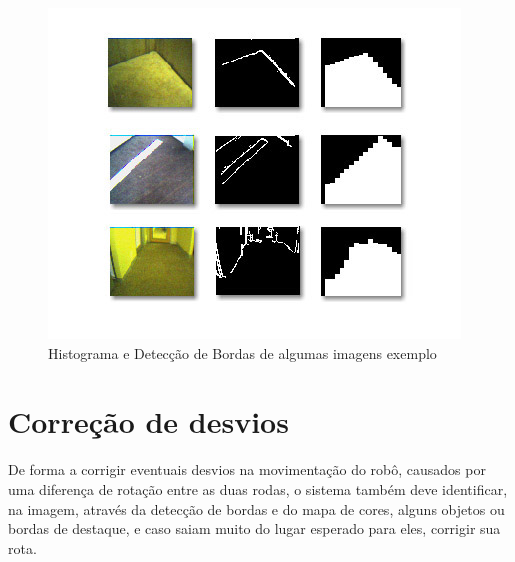 \begin{figure}[h!]
    \center
    \includegraphics[scale=1]{imagens/polly_sample.jpg}
    \caption{Histograma e Detecção de Bordas de algumas imagens exemplo}
    \label{vis_fig01}
\end{figure}

\section{Correção de desvios}

De forma a corrigir eventuais desvios na movimentação do robô, causados por uma diferença de rotação entre as duas rodas, o sistema também deve identificar, na imagem, através da detecção de bordas e do mapa de cores, alguns objetos ou bordas de destaque, e caso saiam muito do lugar esperado para eles, corrigir sua rota.
